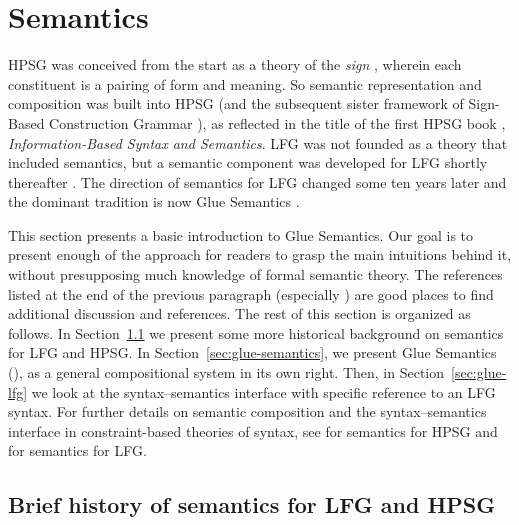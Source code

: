 \section{Semantics}


HPSG  was conceived from the
start as  a theory of the \textit{sign} \citep{Saussure16a-Fr}, 
wherein each constituent is a pairing of form and meaning.  
So semantic representation and composition  was built into HPSG (and the subsequent sister framework of Sign-Based Construction Grammar \citealt{BS2012a-ed}), as reflected in the title of the first HPSG
book \citep{pollard;sag87}, \textit{Information-Based Syntax and
  Semantics}.  LFG was not founded as a theory that included semantics, but a semantic component was developed for LFG shortly thereafter \citep{halvorsen83}.  The direction of semantics for LFG changed some ten years later and the dominant tradition is now Glue Semantics \citep{dalrymple;ea93,dalrymple99,Dalrymple2001a-u,asudeh-lpr,dalrymple;ea19}.  

This section presents a basic introduction to Glue Semantics. 
Our goal is to present enough of the approach for readers to grasp the main intuitions behind it, without presupposing much knowledge of formal semantic theory.  The references listed at the end of the previous paragraph (especially \citet{dalrymple;ea19}) are good places to find additional discussion and references.  
The rest of this section is organized as follows. In Section~\ref{sec:background} we present some more historical background on semantics for LFG and HPSG.  In Section~\ref{sec:glue-semantics}, we present Glue Semantics (\glue), as a general compositional system in its own right. Then, in Section~\ref{sec:glue-lfg} we look at the syntax--semantics interface with specific reference to an LFG syntax. For further details on semantic composition and the syntax--semantics interface in constraint-based theories of syntax, see  for semantics for HPSG and \citet{asudeh-lfg-glue} for semantics for LFG.

\subsection{Brief history of semantics for LFG and HPSG}
\label{sec:background}

